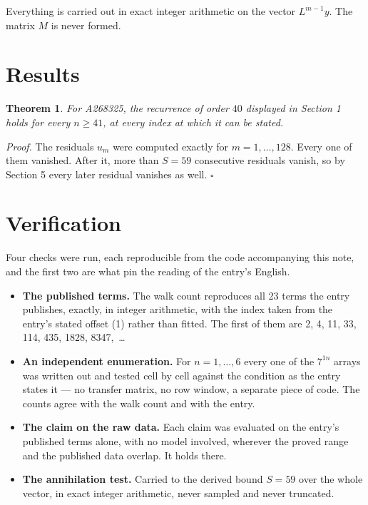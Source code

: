 \documentclass[11pt]{article}
\newtheorem{theorem}{Theorem}
\theoremstyle{definition}
\begin{document}
Everything is carried out in exact integer arithmetic on the vector $L^{m-1}y$. The matrix $M$ is never formed.

\section{Results}

\begin{theorem} For A268325, the recurrence of order $40$ displayed in Section 1 holds for every $n \ge 41$, at every index at which it can be stated.\end{theorem}

{\itshape Proof.} The residuals $u_m$ were computed exactly for $m = 1,\dots,128$. Every one of them vanished. After it, more than $S = 59$ consecutive residuals vanish, so by Section 5 every later residual vanishes as well. $\square$

\section{Verification}

Four checks were run, each reproducible from the code accompanying this note, and the first two are what pin the reading of the entry's English.

\begin{itemize}

\item {\bfseries The published terms.} The walk count reproduces all 23 terms the entry publishes, exactly, in integer arithmetic, with the index taken from the entry's stated offset (1) rather than fitted. The first of them are 2, 4, 11, 33, 114, 435, 1828, 8347,~\dots

\item {\bfseries An independent enumeration.} For $n = 1,\dots,6$ every one of the $7^{1n}$ arrays was written out and tested cell by cell against the condition as the entry states it --- no transfer matrix, no row window, a separate piece of code. The counts agree with the walk count and with the entry.

\item {\bfseries The claim on the raw data.} Each claim was evaluated on the entry's published terms alone, with no model involved, wherever the proved range and the published data overlap. It holds there.

\item {\bfseries The annihilation test.} Carried to the derived bound $S = 59$ over the whole vector, in exact integer arithmetic, never sampled and never truncated.

\end{itemize}
\end{document}
